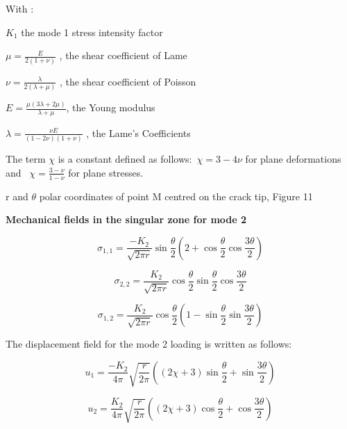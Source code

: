 With : 

$K_1$  the mode 1 stress intensity factor

$\mu=\frac{E}{2 (1+\nu)}$ , the shear coefficient of Lame

$\nu=\frac{\lambda}{2 (\lambda+\mu)}$ , the shear coefficient of Poisson

$E=\frac{\mu (3 \lambda+2 \mu)}{\lambda+\mu}$, the Young modulus

$\lambda=\frac{\nu E}{(1-2 \nu)(1+\nu)}$ , the Lame’s Coefficients

The term $\chi$ is a constant defined as follows:\ $\chi=3-4\nu$ for plane deformations and \ $\chi=\frac{3-\nu}{1-\nu}$  for plane stresses.

r and $\theta$ polar coordinates of point M centred on the crack tip, Figure 11

\smallskip

\textbf{Mechanical fields in the singular zone for mode 2}

\begin{equation}
	\sigma_{1,1} = \frac{-K_{2}}{\sqrt{2 \pi r}} \sin{\frac{\theta}{2}}  \left( 2+\cos{\frac{\theta}{2}} \cos{\frac{3 \theta}{2}} \right)
	\label{eq:eq112}
\end{equation}

\begin{equation}
	\sigma_{2,2} = \frac{K_{2}}{\sqrt{2 \pi r}} \cos{\frac{\theta}{2}}  \sin{\frac{\theta}{2}} \cos{\frac{3 \theta}{2}}
	\label{eq:eq113}
\end{equation}

\begin{equation}
	\sigma_{1,2} = \frac{K_{2}}{\sqrt{2 \pi r}} \cos{\frac{\theta}{2}}  \left( 1-\sin{\frac{\theta}{2}} \sin{\frac{3 \theta}{2}} \right)
	\label{eq:eq114}
\end{equation}

The displacement field for the mode 2 loading is written as follows:

\begin{equation}
	u_{1} = \frac{-K_{2}}{4 \pi} \sqrt{\frac{r}{2 \pi}} \left((2 \chi+3) \sin{\frac{\theta}{2}}+\sin{\frac{3 \theta}{2}}\right)
	\label{eq:eq115}
\end{equation}

\begin{equation}
	u_{2} = \frac{K_{2}}{4 \pi} \sqrt{\frac{r}{2 \pi}} \left((2 \chi+3) \cos{\frac{\theta}{2}}+\cos{\frac{3 \theta}{2}}\right)
	\label{eq:eq117}
\end{equation}

